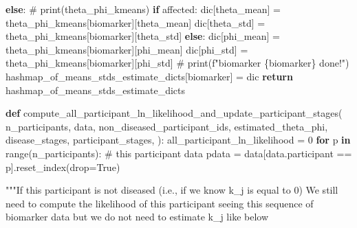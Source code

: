 \documentclass[
  letterpaper,
  DIV=11,
  numbers=noendperiod]{scrreprt}
\newenvironment{Shaded}{\begin{snugshade}}{\end{snugshade}}
\newcommand{\BuiltInTok}[1]{\textcolor[rgb]{0.00,0.23,0.31}{#1}}
\newcommand{\CommentTok}[1]{\textcolor[rgb]{0.37,0.37,0.37}{#1}}
\newcommand{\ControlFlowTok}[1]{\textcolor[rgb]{0.00,0.23,0.31}{\textbf{#1}}}
\newcommand{\DecValTok}[1]{\textcolor[rgb]{0.68,0.00,0.00}{#1}}
\newcommand{\KeywordTok}[1]{\textcolor[rgb]{0.00,0.23,0.31}{\textbf{#1}}}
\newcommand{\NormalTok}[1]{\textcolor[rgb]{0.00,0.23,0.31}{#1}}
\newcommand{\OperatorTok}[1]{\textcolor[rgb]{0.37,0.37,0.37}{#1}}
\newcommand{\StringTok}[1]{\textcolor[rgb]{0.13,0.47,0.30}{#1}}
\newcommand{\VariableTok}[1]{\textcolor[rgb]{0.07,0.07,0.07}{#1}}
\begin{document}
\begin{Shaded}
\begin{Highlighting}[]
            \ControlFlowTok{else}\NormalTok{:}
                \CommentTok{\# print(theta\_phi\_kmeans)}
                \ControlFlowTok{if}\NormalTok{ affected:}
\NormalTok{                    dic[}\StringTok{\textquotesingle{}theta\_mean\textquotesingle{}}\NormalTok{] }\OperatorTok{=}\NormalTok{ theta\_phi\_kmeans[biomarker][}\StringTok{\textquotesingle{}theta\_mean\textquotesingle{}}\NormalTok{]}
\NormalTok{                    dic[}\StringTok{\textquotesingle{}theta\_std\textquotesingle{}}\NormalTok{] }\OperatorTok{=}\NormalTok{ theta\_phi\_kmeans[biomarker][}\StringTok{\textquotesingle{}theta\_std\textquotesingle{}}\NormalTok{]}
                \ControlFlowTok{else}\NormalTok{:}
\NormalTok{                    dic[}\StringTok{\textquotesingle{}phi\_mean\textquotesingle{}}\NormalTok{] }\OperatorTok{=}\NormalTok{ theta\_phi\_kmeans[biomarker][}\StringTok{\textquotesingle{}phi\_mean\textquotesingle{}}\NormalTok{]}
\NormalTok{                    dic[}\StringTok{\textquotesingle{}phi\_std\textquotesingle{}}\NormalTok{] }\OperatorTok{=}\NormalTok{ theta\_phi\_kmeans[biomarker][}\StringTok{\textquotesingle{}phi\_std\textquotesingle{}}\NormalTok{]}
        \CommentTok{\# print(f"biomarker \{biomarker\} done!")}
\NormalTok{        hashmap\_of\_means\_stds\_estimate\_dicts[biomarker] }\OperatorTok{=}\NormalTok{ dic}
    \ControlFlowTok{return}\NormalTok{ hashmap\_of\_means\_stds\_estimate\_dicts}

\KeywordTok{def}\NormalTok{ compute\_all\_participant\_ln\_likelihood\_and\_update\_participant\_stages(}
\NormalTok{        n\_participants,}
\NormalTok{        data,}
\NormalTok{        non\_diseased\_participant\_ids,}
\NormalTok{        estimated\_theta\_phi,}
\NormalTok{        disease\_stages,}
\NormalTok{        participant\_stages,}
\NormalTok{):}
\NormalTok{    all\_participant\_ln\_likelihood }\OperatorTok{=} \DecValTok{0}
    \ControlFlowTok{for}\NormalTok{ p }\KeywordTok{in} \BuiltInTok{range}\NormalTok{(n\_participants):}
        \CommentTok{\# this participant data}
\NormalTok{        pdata }\OperatorTok{=}\NormalTok{ data[data.participant }\OperatorTok{==}\NormalTok{ p].reset\_index(drop}\OperatorTok{=}\VariableTok{True}\NormalTok{)}

        \CommentTok{"""If this participant is not diseased (i.e., if we know k\_j is equal to 0)}
\CommentTok{        We still need to compute the likelihood of this participant seeing this sequence of biomarker data}
\CommentTok{        but we do not need to estimate k\_j like below}


\end{Highlighting}
\end{Shaded}
\end{document}
